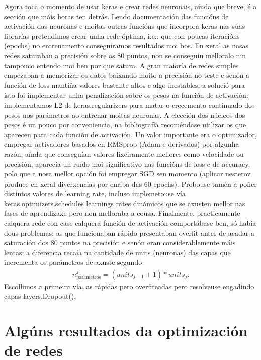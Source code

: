 \documentclass[12pt,a4paper,twoside]{article}
\begin{document}
Agora toca o momento de usar keras e crear redes neuronais, aínda que breve, é a sección que máis horas ten detrás. Lendo documentación das funcións de activación
das neuronas e moitas outras funcións que incorpora keras nas súas librarías pretendimos crear unha rede óptima, i.e., que con poucas iteracións (epochs) no
entrenamento conseguiramos resultados moi bos. En xeral as nosas redes saturaban a precisión sobre os 80 puntos, non se conseguiu melloralo nin tampouco
entendo moi ben por que satura. A gran maioría de redes simples empezaban a memorizar os datos baixando moito a precisión no teste e senón a función de loss mantiña
valores bastante altos e algo inestables, a solució para isto foi implementar unha penalización sobre os pesos na función de activación: implementamos L2 de 
keras.regularizers para matar o crecemento continuado dos pesos nos parámetros ao entrenar moitas neuronas. A elección dos núcleos dos pesos é un pouco
por conveniencia, na bibliografía recoméndase utilizar os que aparecen para cada función de activación. Un valor importante era o optimizador, 
empregar activadores basados en RMSprop (Adam e derivados) por algunha razón, aínda que conseguían valores lixeiramente mellores como velocidade ou precisión,
aparecía un ruído moi significativo nas funcións de loss e de accuracy, polo que a nosa mellor opción foi empregar SGD sen momento (aplicar nesterov produce en
xeral diverxencias por enriba das 60 epochs). Probouse tamén a poñer distintos valores de learning rate, incluso implemetouse vía
keras.optimizers.schedules learnings rates dinámicos que se axusten mellor nas fases de aprendizaxe pero non melloraba a cousa. Finalmente, practicamente calquera
rede con case calquera función de activación comportábase ben, só había dous problemas: as que funcionaban rápido presentaban overfit antes de acadar a saturación
dos 80 puntos na precisión e senón eran considerablemente máis lentas; a diferencia recaía na cantidade de units (neuronas) das capas que incrementa os
parámetros de axuste segundo
\begin{align*}
    n_{\text{parametros}}^j = (units_{j-1} + 1) * units_j.
\end{align*}
Escollimos a primeira vía, as rápidas pero overfiteadas pero resolveuse engadindo capas layers.Dropout().

\newpage
\section*{Algúns resultados da optimización de redes}
\end{document}
